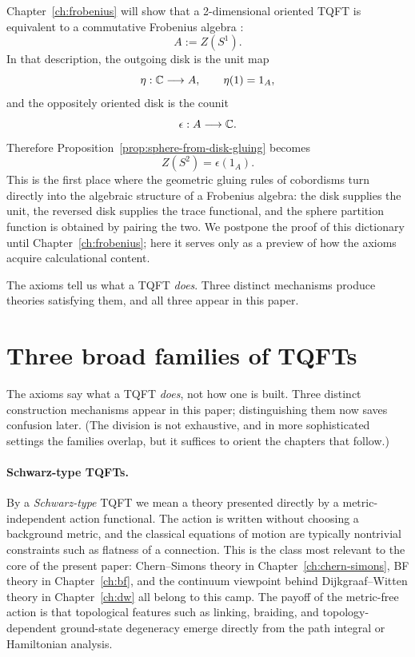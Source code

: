 Chapter~\ref{ch:frobenius} will show that a 2-dimensional oriented TQFT is equivalent to a commutative Frobenius algebra \cite{Kock2004Frobenius}:
\begin{equation}\label{eq:frobenius-preview-algebra}
A := Z(S^1).
\end{equation}
In that description, the outgoing disk is the unit map
\begin{equation}\label{eq:unit-map-preview}
\eta : \mathbb{C} \longrightarrow A,
\qquad
\eta(1) = 1_A,
\end{equation}
and the oppositely oriented disk is the counit
\begin{equation}\label{eq:counit-map-preview}
\epsilon : A \longrightarrow \mathbb{C}.
\end{equation}
Therefore Proposition~\ref{prop:sphere-from-disk-gluing} becomes
\begin{equation}\label{eq:ZS2-epsilon1}
Z(S^2) = \epsilon(1_A).
\end{equation}
This is the first place where the geometric gluing rules of cobordisms turn directly into the algebraic structure of a Frobenius algebra: the disk supplies the unit, the reversed disk supplies the trace functional, and the sphere partition function is obtained by pairing the two. We postpone the proof of this dictionary until Chapter~\ref{ch:frobenius}; here it serves only as a preview of how the axioms acquire calculational content.

\medskip

\noindent The axioms tell us what a TQFT \emph{does}.  Three distinct mechanisms produce theories satisfying them, and all three appear in this paper.

\section{Three broad families of TQFTs}\label{sec:tqft-taxonomy}

The axioms say what a TQFT \emph{does}, not how one is built.  Three distinct construction mechanisms appear in this paper; distinguishing them now saves confusion later.  (The division is not exhaustive, and in more sophisticated settings the families overlap, but it suffices to orient the chapters that follow.)

\paragraph{Schwarz-type TQFTs.}
By a \emph{Schwarz-type} TQFT we mean a theory presented directly by a metric-independent action functional. The action is written without choosing a background metric, and the classical equations of motion are typically nontrivial constraints such as flatness of a connection. This is the class most relevant to the core of the present paper: Chern--Simons theory in Chapter~\ref{ch:chern-simons}, BF theory in Chapter~\ref{ch:bf}, and the continuum viewpoint behind Dijkgraaf--Witten theory in Chapter~\ref{ch:dw} all belong to this camp. The payoff of the metric-free action is that topological features such as linking, braiding, and topology-dependent ground-state degeneracy emerge directly from the path integral or Hamiltonian analysis.

